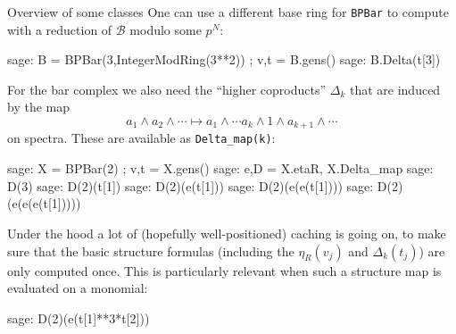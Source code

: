 \documentclass[a4paper]{paper}
\newcommand{\stt}[1]{{\tt#1}}
\newcommand{\scrb}{{\mathcal B}}
\begin{document}
\begin{section}{Overview of some classes}
One can use a different base ring for \stt{BPBar} to compute with a reduction
of $\scrb$ modulo some $p^N$:
\begin{sagecommandline}
sage: B = BPBar(3,IntegerModRing(3**2)) ; v,t = B.gens()
sage: B.Delta(t[3])
\end{sagecommandline}

For the bar complex we also need the \enquote{higher coproducts} $\Delta_k$
that are induced by the map
$$a_1\land a_2\land\cdots \mapsto
a_1\land\cdots a_k\land 1\land a_{k+1}\land\cdots$$
on spectra.
These are available as \stt{Delta\_map(k)}:
\begin{sagecommandline}
sage: X = BPBar(2) ; v,t = X.gens()
sage: e,D = X.etaR, X.Delta_map
sage: D(3)
sage: D(2)(t[1])
sage: D(2)(e(t[1]))
sage: D(2)(e(e(t[1])))
sage: D(2)(e(e(e(t[1]))))
\end{sagecommandline}

Under the hood a lot of (hopefully well-positioned) caching is going on, to make sure that
the basic structure formulas (including the $\eta_R(v_j)$ and $\Delta_k(t_j)$)
are only computed once.
This is particularly relevant when such a structure map is evaluated on a monomial:
\begin{sagecommandline}
sage: D(2)(e(t[1]**3*t[2]))
\end{sagecommandline}

\end{section}
\end{document}
